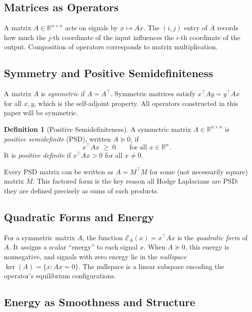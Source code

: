\documentclass[11pt]{article}
\theoremstyle{definition}
\newtheorem{definition}[theorem]{Definition}
\theoremstyle{remark}
\newcommand{\R}{\mathbb{R}}
\begin{document}
\subsection{Matrices as Operators}

A matrix $A \in \R^{n\times n}$ acts on signals by $x \mapsto Ax$. The $(i,j)$
entry of $A$ records how much the $j$-th coordinate of the input influences the
$i$-th coordinate of the output. Composition of operators corresponds to matrix
multiplication.

\subsection{Symmetry and Positive Semidefiniteness}

A matrix $A$ is \emph{symmetric} if $A = A^\top$. Symmetric matrices satisfy
$x^\top Ay = y^\top Ax$ for all $x,y$, which is the self-adjoint property. All
operators constructed in this paper will be symmetric.

\begin{definition}[Positive Semidefiniteness]
A symmetric matrix $A \in \R^{n\times n}$ is \emph{positive semidefinite}
(PSD), written $A \succeq 0$, if
\[
  x^\top A x \;\geq\; 0 \qquad \text{for all } x \in \R^n.
\]
It is \emph{positive definite} if $x^\top Ax > 0$ for all $x \neq 0$.
\end{definition}

Every PSD matrix can be written as $A = M^\top M$ for some (not necessarily
square) matrix $M$. This factored form is the key reason all Hodge Laplacians
are PSD: they are defined precisely as sums of such products.

\subsection{Quadratic Forms and Energy}

For a symmetric matrix $A$, the function $\mathcal{E}_A(x) = x^\top Ax$ is the
\emph{quadratic form} of $A$. It assigns a scalar ``energy'' to each signal
$x$. When $A \succeq 0$, this energy is nonnegative, and signals with zero
energy lie in the \emph{nullspace} $\ker(A) = \{x : Ax = 0\}$. The nullspace
is a linear subspace encoding the operator's equilibrium configurations.

\subsection{Energy as Smoothness and Structure}
\end{document}
